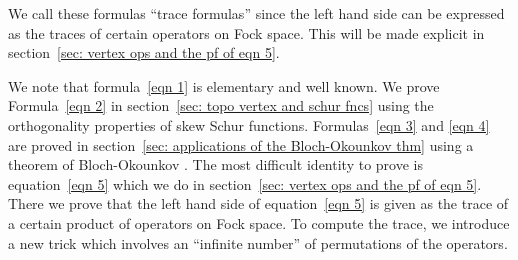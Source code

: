 \documentclass[12pt]{amsart}
\newcommand{\Vsf}{\mathsf{V}}
\newcommand{\bx}{\square}
\renewcommand{\emptyset}{\varnothing}
\newtheorem{theorem}{Theorem}%
\theoremstyle{definition}
\begin{document}
\begin{comment} %
\begin{theorem}\label{thm: main formulas}
The following identities hold:
\begin{align}
\sum_{\lambda} q^{|\lambda |} &= \prod_{m=1}^{\infty} (1-q^{m})^{-1}\label{eqn 1}\\
\sum_{\lambda} q^{|\lambda |} p^{||\lambda ||^{2}} \Vsf_{\lambda'
\lambda \emptyset }&=  M(p) \prod_{d=1}^{\infty} (1-q^{d})^{-1}M(p,q^{d})\label{eqn 2}\\
\quad\nonumber \\
\sum_{\lambda} q^{|\lambda |}\frac{\Vsf_{\lambda
\bx\emptyset}}{\Vsf_{\lambda \emptyset \emptyset}} &=
(1-p)^{-1}\prod_{d=1}^{\infty} \frac{(1-q^{d})}{(1-pq^{d})(1-p^{-1}q^{d})}\label{eqn 3}\\
\quad\nonumber \\
\sum_{\lambda} q^{|\lambda |} p \frac{\Vsf_{\bx \bx 
\lambda}}{\Vsf_{\emptyset \emptyset \lambda}} &=
\prod_{m=1}^{\infty}(1-q^{m})^{-1}\cdot \left\{
1+\frac{p}{(1-p)^{2}}+\sum_{d=1}^{\infty}\sum_{k|d}k(p^{k}+p^{-k})q^{q}\right\}\label{eqn 4}\\
\quad\nonumber \\
\quad \quad \sum_{\lambda} q^{|\lambda |} p^{||\lambda ||^{2}}
\frac{\Vsf_{\lambda \bx \emptyset}}{\Vsf_{\lambda \emptyset
\emptyset}}\Vsf_{\lambda' \lambda \emptyset} &=
(1-p)^{-1}M(p)\prod_{d=1}^{\infty}
\frac{M(p,q^{d})}{(1-pq^{d})(1-p^{-1}q^{d})}\label{eqn 5}
\end{align}
\end{theorem}
\end{comment}




We call these formulas ``trace formulas'' since the left hand side can
be expressed as the traces of certain operators on Fock space. This
will be made explicit in section~\ref{sec: vertex ops and the pf of
eqn 5}.

We note that formula~\eqref{eqn 1} is elementary and well known. We
prove Formula~\eqref{eqn 2} in section~\ref{sec: topo vertex and schur
fncs} using the orthogonality properties of skew Schur
functions. Formulas~\eqref{eqn 3} and \eqref{eqn 4} are proved in
section~\ref{sec: applications of the Bloch-Okounkov thm} using a
theorem of Bloch-Okounkov \cite{Bloch-Okounkov}. The most difficult
identity to prove is equation~\eqref{eqn 5} which we do in
section~\ref{sec: vertex ops and the pf of eqn 5}. There we prove that
the left hand side of equation~\eqref{eqn 5} is given as the trace of
a certain product of operators on Fock space. To compute the trace, we
introduce a new trick which involves an ``infinite number'' of
permutations of the operators.
\end{document}
